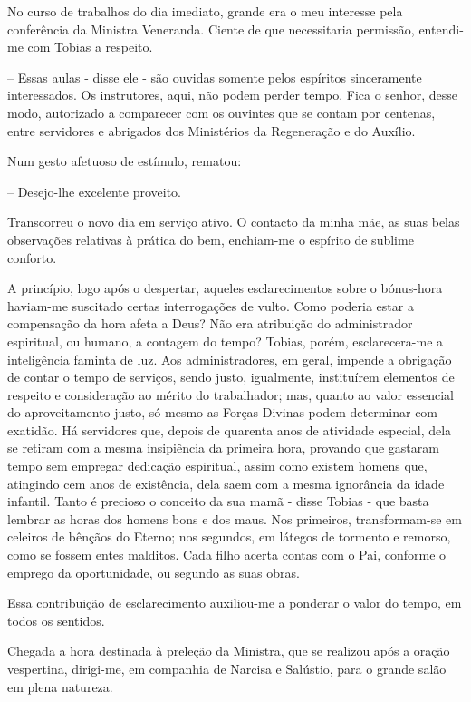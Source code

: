 \documentclass[portuguese,12pt,a4paper]{scrbook}
\begin{document}
	No curso de trabalhos do dia imediato, grande era o meu interesse pela conferência da Ministra Veneranda. Ciente de que necessitaria permissão, entendi-me com Tobias a respeito.
	
	– Essas aulas - disse ele - são ouvidas somente pelos espíritos sinceramente interessados. Os instrutores, aqui, não podem perder tempo. Fica o senhor, desse modo, autorizado a comparecer com os ouvintes que se contam por centenas, entre servidores e abrigados dos Ministérios da Regeneração e do Auxílio.
	
	Num gesto afetuoso de estímulo, rematou:
	
	– Desejo-lhe excelente proveito.
	
	Transcorreu o novo dia em serviço ativo. O contacto da minha mãe, as suas belas observações relativas à prática do bem, enchiam-me o espírito de sublime conforto.
	
	A princípio, logo após o despertar, aqueles esclarecimentos sobre o bónus-hora haviam-me suscitado certas interrogações de vulto. Como poderia estar a compensação da hora afeta a Deus? Não era atribuição do administrador espiritual, ou humano, a contagem do tempo? Tobias, porém, esclarecera-me a inteligência faminta de luz. Aos administradores, em geral, impende a obrigação de contar o tempo de serviços, sendo justo, igualmente, instituírem elementos de respeito e consideração ao mérito do trabalhador; mas, quanto ao valor essencial do aproveitamento justo, só mesmo as Forças Divinas podem determinar com exatidão. Há servidores que, depois de quarenta anos de atividade especial, dela se retiram com a mesma insipiência da primeira hora, provando que gastaram tempo sem empregar dedicação espiritual, assim como existem homens que, atingindo cem anos de existência, dela saem com a mesma ignorância da idade infantil. Tanto é precioso o conceito da sua mamã - disse Tobias - que basta lembrar as horas dos homens bons e dos maus. Nos primeiros, transformam-se em celeiros de bênçãos do Eterno; nos segundos, em látegos de tormento e remorso, como se fossem entes malditos. Cada filho acerta contas com o Pai, conforme o emprego da oportunidade, ou segundo as suas obras.
	
	Essa contribuição de esclarecimento auxiliou-me a ponderar o valor do tempo, em todos os sentidos.
	
	Chegada a hora destinada à preleção da Ministra, que se realizou após a oração vespertina, dirigi-me, em companhia de Narcisa e Salústio, para o grande salão em plena natureza.
	
\end{document}
